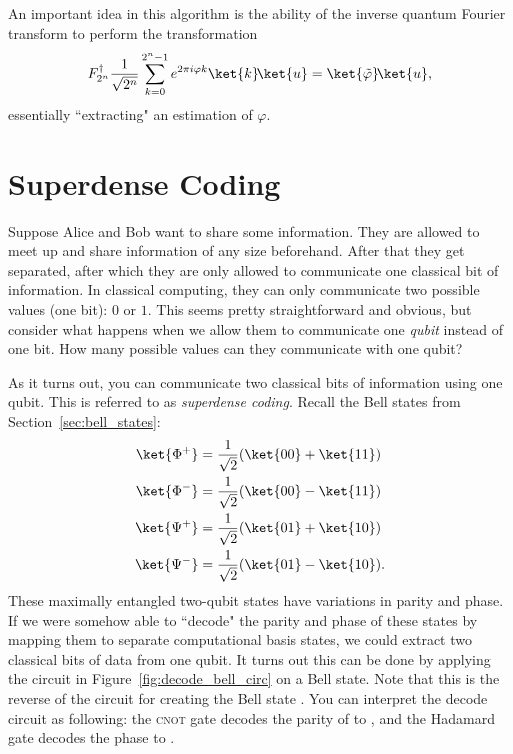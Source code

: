 An important idea in this algorithm is the ability of the inverse quantum Fourier transform to perform the transformation
\begin{equation}
  F_{2^n}^\dagger
  \dfrac{1}{\sqrt{2^n}}\sum_{k=0}^{2^n-1} e^{2\pi i\varphi k}\ket{k}\!\ket{u} = \ket{\tilde{\varphi}}\!\ket{u},
\end{equation}
essentially ``extracting" an estimation \ket{\tilde{\varphi}} of $\varphi$.

\section{Superdense Coding}
Suppose Alice and Bob want to share some information. They are allowed to meet up and share information of any size beforehand. After that they get separated, after which they are only allowed to communicate one classical bit of information. In classical computing, they can only communicate two possible values (one bit): $0$ or $1$. This seems pretty straightforward and obvious, but consider what happens when we allow them to communicate one \emph{qubit} instead of one bit. How many possible values can they communicate with one qubit?

As it turns out, you can communicate two classical bits of information using one qubit. This is referred to as \emph{superdense coding}. Recall the Bell states from Section~\ref{sec:bell_states}:
\begin{align}
  \ket{\Phi^+} &= \dfrac{1}{\sqrt2}(\ket{00} + \ket{11}) \\
  \ket{\Phi^-} &= \dfrac{1}{\sqrt2}(\ket{00} - \ket{11}) \\
  \ket{\Psi^+} &= \dfrac{1}{\sqrt2}(\ket{01} + \ket{10}) \\
  \ket{\Psi^-} &= \dfrac{1}{\sqrt2}(\ket{01} - \ket{10}).
\end{align}
These maximally entangled two-qubit states have variations in parity and phase. If we were somehow able to ``decode" the parity and phase of these states by mapping them to separate computational basis states, we could extract two classical bits of data from one qubit. It turns out this can be done by applying the circuit in Figure~\ref{fig:decode_bell_circ} on a Bell state. Note that this is the reverse of the circuit for creating the Bell state \ket{\Phi^+}. You can interpret the decode circuit as following: the \textsc{cnot} gate decodes the parity of  to , and the Hadamard gate decodes the phase to .

